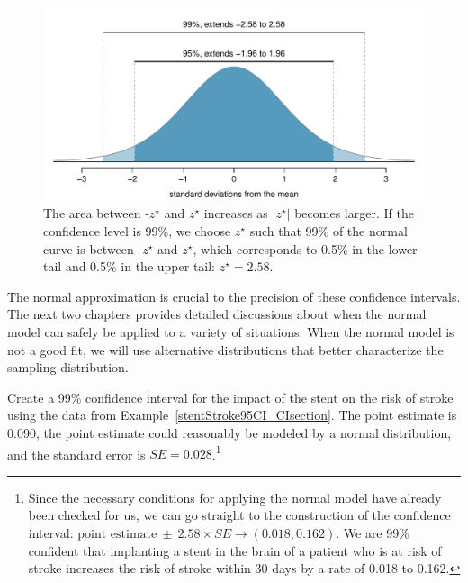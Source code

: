 \begin{figure}[ht]
\centering
\includegraphics[width=\textwidth]{02/figures/choosingZForCI/choosingZForCI}
\caption{The area between -$z^{\star}$ and $z^{\star}$ increases as $|z^{\star}|$ becomes larger. If the confidence level is 99\%, we choose $z^{\star}$ such that 99\% of the normal curve is between -$z^{\star}$ and $z^{\star}$, which corresponds to 0.5\% in the lower tail and 0.5\% in the upper tail: $z^{\star}=2.58$.}
\label{choosingZForCI}
\end{figure}

The normal approximation is crucial to the precision of these confidence intervals. The next two chapters provides detailed discussions about when the normal model can safely be applied to a variety of situations. When the normal model is not a good fit, we will use alternative distributions that better characterize the sampling distribution.


\begin{exercise} \label{find99CIForRun10AgeExercise}
Create a 99\% confidence interval for the impact of the stent on the risk of stroke using the data from Example~\ref{stentStroke95CI_CIsection}. The point estimate is 0.090, the point estimate could reasonably be modeled by a normal distribution, and the standard error is $SE = 0.028$.\footnote{Since the necessary conditions for applying the normal model have already been checked for us, we can go straight to the construction of the confidence interval: $\text{point estimate}\ \pm\ 2.58 \times  SE \rightarrow (0.018, 0.162)$. We are 99\% confident that implanting a stent in the brain of a patient who is at risk of stroke increases the risk of stroke within 30 days by a rate of 0.018 to 0.162.} 
\end{exercise}

